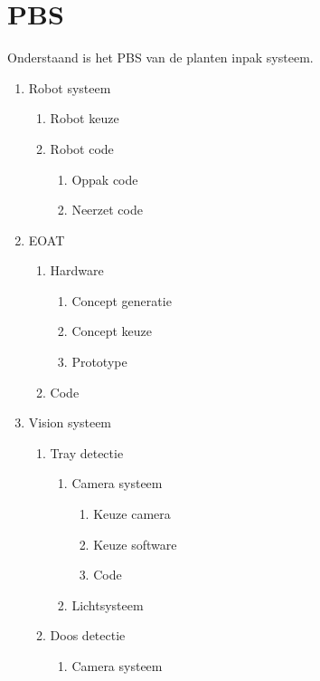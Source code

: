 \section*{PBS}

Onderstaand is het PBS van de planten inpak systeem.

\begin{enumerate}[label*=\arabic*.]
	\item Robot systeem
	\begin{enumerate}[label*=\arabic*.]
		\item Robot keuze
		\item Robot code
		\begin{enumerate}[label*=\arabic*.]
			\item Oppak code
			\item Neerzet code
		\end{enumerate}
	\end{enumerate}
	\item EOAT
	\begin{enumerate}[label*=\arabic*.]
		\item Hardware
		\begin{enumerate}[label*=\arabic*.]
			\item Concept generatie
			\item Concept keuze
			\item Prototype
		\end{enumerate}
		\item Code
	\end{enumerate}
	\item Vision systeem
	\begin{enumerate}[label*=\arabic*.]
		\item Tray detectie
		\begin{enumerate}[label*=\arabic*.]
			\item Camera systeem
			\begin{enumerate}[label*=\arabic*.]
				\item Keuze camera
				\item Keuze software
				\item Code
			\end{enumerate}
			\item Lichtsysteem
		\end{enumerate}
		\item Doos detectie
			\begin{enumerate}[label*=\arabic*.]
				\item Camera systeem
				\begin{enumerate}[label*=\arabic*.]

\end{enumerate}
\end{enumerate}
\end{enumerate}
\end{enumerate}
